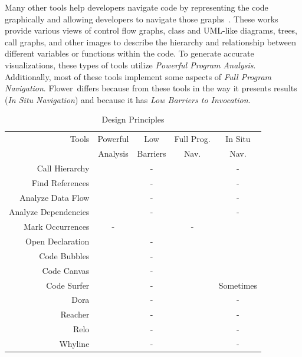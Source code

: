 \documentclass[conference]{IEEEtran}
\newcommand{\toolName}{Flower}
\begin{document}
Many other tools help developers navigate code by representing the code graphically and allowing developers to navigate those graphs~\cite{CodeBubbles,CodeCanvas,CodeSurfer,Dora,Reacher,Relo,Whyline}. 
These works provide various views of control flow graphs, class and UML-like diagrams, trees, call graphs, and other images to describe the hierarchy and relationship between different variables or functions within the code. 
To generate accurate visualizations, these types of tools utilize \textit{Powerful Program Analysis}.
Additionally, most of these tools implement some aspects of \textit{Full Program Navigation}.
\toolName~differs because from these tools in the way it presents results (\textit{In Situ Navigation}) and because it has \textit{Low Barriers to Invocation}.
\begin{table}
	\centering
	\caption{Design Principles}
	\begin{tabular}{r|c|c|c|c}
		\rowcolor{Gray}
		\hline
		Tools & Powerful & Low & Full Prog. & In Situ\\
		\rowcolor{Gray}
		 & Analysis & Barriers & Nav. & Nav.\\
		\hline
		Call Hierarchy & \checkmark & - & \checkmark & -\\
		\rowcolor{Gray}
		Find References & \checkmark & - & \checkmark & -\\
		Analyze Data Flow & \checkmark & - & \checkmark & -\\
		\rowcolor{Gray}
		Analyze Dependencies & \checkmark & - & \checkmark & -\\
		Mark Occurrences & - & \checkmark & - & \checkmark \\
		\rowcolor{Gray}
		Open Declaration & \checkmark & - & \checkmark & \checkmark \\
		Code Bubbles & \checkmark & - & \checkmark & \checkmark \\
		\rowcolor{Gray}
		Code Canvas & \checkmark & - & \checkmark & \checkmark \\
		Code Surfer & \checkmark & - & \checkmark & Sometimes \\
		\rowcolor{Gray}
		Dora & \checkmark & - & \checkmark & - \\
		Reacher & \checkmark & - & \checkmark & - \\
		\rowcolor{Gray}
		Relo & \checkmark & - & \checkmark & - \\
		Whyline & \checkmark & - & \checkmark & - \\
		\hline
	\end{tabular}
	\label{table:background}
\end{table}
\end{document}
